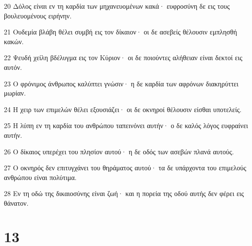 \par 20 Δόλος είναι εν τη καρδία των μηχανευομένων κακά· ευφροσύνη δε εις τους βουλευομένους ειρήνην.
\par 21 Ουδεμία βλάβη θέλει συμβή εις τον δίκαιον· οι δε ασεβείς θέλουσιν εμπλησθή κακών.
\par 22 Ψευδή χείλη βδέλυγμα εις τον Κύριον· οι δε ποιούντες αλήθειαν είναι δεκτοί εις αυτόν.
\par 23 Ο φρόνιμος άνθρωπος καλύπτει γνώσιν· η δε καρδία των αφρόνων διακηρύττει μωρίαν.
\par 24 Η χειρ των επιμελών θέλει εξουσιάζει· οι δε οκνηροί θέλουσιν είσθαι υποτελείς.
\par 25 Η λύπη εν τη καρδία του ανθρώπου ταπεινόνει αυτήν· ο δε καλός λόγος ευφραίνει αυτήν.
\par 26 Ο δίκαιος υπερέχει του πλησίον αυτού· η δε οδός των ασεβών πλανά αυτούς.
\par 27 Ο οκνηρός δεν επιτυγχάνει του θηράματος αυτού· τα δε υπάρχοντα του επιμελούς ανθρώπου είναι πολύτιμα.
\par 28 Εν τη οδώ της δικαιοσύνης είναι ζωή· και η πορεία της οδού αυτής δεν φέρει εις θάνατον.

\chapter{13}

